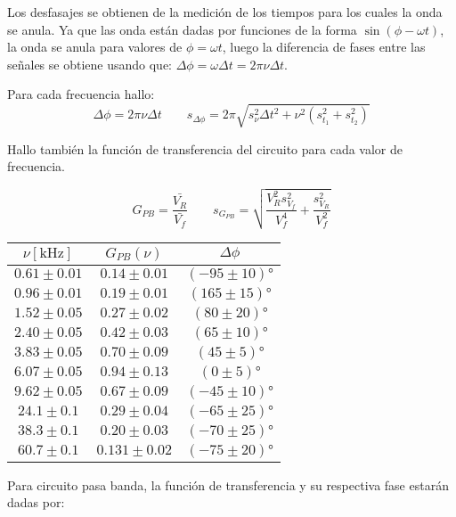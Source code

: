 \documentclass[12pt,a4paper]{article}
\begin{document}
\hspace{1cm}

Los desfasajes se obtienen de la medición de los tiempos para los cuales la onda se anula. Ya que las onda están dadas por funciones de la forma $ \sin(\phi - \omega t)$, la onda se anula para valores de $\phi = \omega t$, luego la diferencia de fases entre las señales se obtiene usando que: $\Delta \phi = \omega \Delta t = 2 \pi \nu \Delta t$.


\hspace{1cm}

Para cada frecuencia hallo:   $$\Delta \phi = 2 \pi \nu \Delta t \qquad s_{\Delta \phi} = 2\pi \sqrt{ s_{\nu}^2 \Delta t^2 + \nu^2 ( s_{t_1}^2 + s_{t_2}^2)  } $$

Hallo también la función de transferencia del circuito para cada valor de frecuencia. 

$$G_{PB} = \frac{\bar{V_R}}{\bar{V_f}} \qquad s_{G_{PB}} = \sqrt{\frac{V_{R}^{2} s_{V_f}^{2}}{V_{f}^{4}} + \frac{s_{V_R}^{2}}{V_{f}^{2}}}
 $$
 \begin{table}[H]
\centering

\begin{tabular}{@{}|c|c|c|@{}}
$\nu [\si\kilo\si\hertz]$ &  $G_{PB}(\nu)$                & $\Delta \phi $\\
                \hline
$0.61 \pm 0.01$ & $0.14 \pm 0.01$  & $(-95 \pm 10)\si\degree $ \\
$0.96 \pm 0.01$ & $0.19\pm 0.01$   & $(165 \pm 15)\si\degree $ \\
$1.52 \pm 0.05$ & $0.27 \pm 0.02$  & $(80 \pm 20)\si\degree $  \\
$2.40\pm 0.05$  & $0.42 \pm 0.03$  & $(65\pm 10)\si\degree $   \\
$3.83\pm 0.05$  & $0.70 \pm 0.09$  & $(45 \pm 5)\si\degree $   \\
$6.07\pm 0.05$  & $0.94 \pm 0.13$  & $(0 \pm 5)\si\degree $    \\
$9.62\pm 0.05$  & $0.67 \pm 0.09$  & $(-45 \pm 10)\si\degree $ \\
$24.1\pm 0.1$   & $0.29 \pm 0.04$  & $(-65\pm 25)\si\degree $  \\
$38.3\pm 0.1$   & $0.20 \pm 0.03$  & $(-70 \pm 25)\si\degree $ \\
$60.7\pm 0.1$   & $0.131 \pm 0.02$ & $(-75 \pm 20)\si\degree $
\end{tabular}
\end{table}

Para circuito pasa banda, la función de transferencia y su respectiva fase estarán dadas por:
\end{document}
